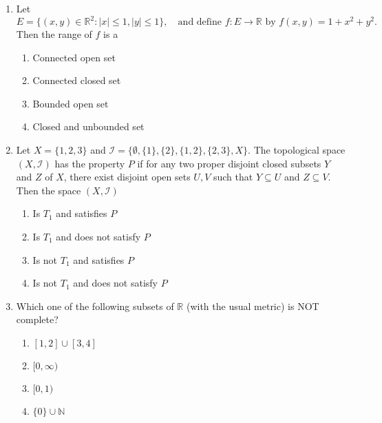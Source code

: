 \documentclass[journal]{IEEEtran}
\numberwithin{equation}{enumi}
\numberwithin{figure}{enumi}
\begin{document}
\begin{enumerate}
\item
Let
\[
E = \{(x,y) \in \mathbb{R}^2 : |x| \leq 1, |y| \leq 1 \}, \quad \text{and define } f : E \to \mathbb{R} \text{ by } f(x,y) = 1 + x^2 + y^2.
\]
Then the range of $f$ is a
\hfill{}
\begin{multicols}{2}
\begin{enumerate}
    \item Connected open set
    \item Connected closed set
    \item Bounded open set
    \item Closed and unbounded set
\end{enumerate}
\end{multicols}

\item
Let $X = \{1,2,3\}$ and $\mathcal{I} = \{\emptyset, \{1\}, \{2\}, \{1,2\}, \{2,3\}, X\}$. The topological space $(X, \mathcal{I})$ has the property $P$ if for any two proper disjoint closed subsets $Y$ and $Z$ of $X$, there exist disjoint open sets $U, V$ such that $Y \subseteq U$ and $Z \subseteq V$. Then the space $(X, \mathcal{I})$
\hfill{}
\begin{multicols}{2}
\begin{enumerate}
    \item Is $T_1$ and satisfies $P$
    \item Is $T_1$ and does not satisfy $P$
    \item Is not $T_1$ and satisfies $P$
    \item Is not $T_1$ and does not satisfy $P$
\end{enumerate}
\end{multicols}

\item
Which one of the following subsets of $\mathbb{R}$ (with the usual metric) is NOT complete?
\hfill{}
\begin{multicols}{4}
\begin{enumerate}
    \item $[1,2] \cup [3,4]$
    \item $[0, \infty)$
    \item $[0,1)$
    \item $\{0\} \cup \mathbb{N}$
\end{enumerate}
\end{multicols}


\end{enumerate}
\end{document}
